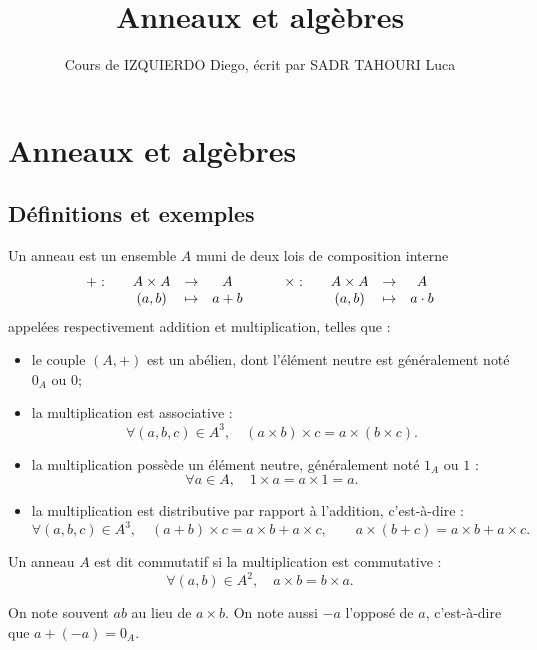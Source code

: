 \documentclass[]{report}
\title{Anneaux et algèbres}
\author{Cours de IZQUIERDO Diego, écrit par SADR TAHOURI Luca}
\date{}
\begin{document}
    \maketitle
    \tableofcontents

    \chapter{Anneaux et algèbres}

\section{Définitions et exemples}

\begin{df}{}{}
    Un anneau est un ensemble $A$ muni de deux lois de composition interne
    \[\begin{array}{ccccc} + : & & A \times A & \to & A \\ & & (a, b) & \mapsto & a + b \end{array} \qquad \begin{array}{ccccc} \times : & & A \times A & \to & A \\ & & (a, b) & \mapsto & a \cdot b \end{array}\]
    appelées respectivement addition et multiplication, telles que :
    \begin{itemize}
        \item[(R1)] le couple $(A, +)$ est un \gr abélien, dont l'élément neutre est généralement noté $0_A$ ou $0$;
        \item[(R2)] la multiplication est associative :
        \[\forall (a, b, c) \in A^3, \quad (a \times b) \times c = a \times (b \times c).\]
        \item[(R3)] la multiplication possède un élément neutre, généralement noté $1_A$ ou $1$ :
        \[\forall a \in A, \quad 1 \times a = a \times 1 = a.\]
        \item[(R4)] la multiplication est distributive par rapport à l'addition, c'est-à-dire :
        \[\forall (a, b, c) \in A^3, \quad (a + b) \times c = a \times b + a \times c, \qquad a \times (b + c) = a \times b + a \times c.\]
    \end{itemize}
\end{df}

Un anneau $A$ est dit commutatif si la multiplication est commutative :
\[\forall (a, b) \in A^2, \quad a \times b = b \times a.\]

\begin{nt}{}{}
    On note souvent $ab$ au lieu de $a \times b$. On note aussi $-a$ l'opposé de $a$, c'est-à-dire que $a + (-a) = 0_A$.
\end{nt}
\end{document}
